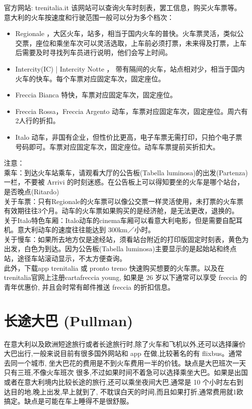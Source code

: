 \documentclass[3pt,a5paper,openright,twoside]{book}
\begin{document}
官方网站: trenitalia.it 该网站可以查询火车时刻表，罢工信息，购买火车票等。
意大利的火车按速度和行驶范围一般可以分为多个档次：
\begin{itemize}
\item  Regionale ，大区火车，站多，相当于国内火车的普快。火车票灵活，类似公交票，座位和乘坐车次可以灵活选取，上车前必须打票，未来得及打票，上车后需要及时寻找列车员进行说明，他们会写上时间。
\item  Intercity(IC) | Intercity Notte ， 带有隔间的火车，站点相对少，相当于国内火车的快车。每个车票对应固定车次，固定座位。
\item  Freccia Bianca 特快，车票对应固定车次，固定座位。
\item  Freccia Rossa，Freccia Argento 动车，车票对应固定车次，固定座位。周六有2人行的折扣。
\item  Italo 动车，非国有企业，但性价比更高，电子车票无需打印，只拍个电子票号码即可。车票对应固定车次，固定座位。动车车票提前买折扣大。
\end{itemize}
注意：\\
乘车：到达火车站乘车，请观看大厅的公告板(Tabella luminosa)的出发(Partenza)一栏，不要被 Arrivi 的时刻迷惑。在公告板上可以得知要坐的火车是哪个站台，是否晚点(Ritardo) \\
关于车票：只有Regionale的火车票可以像公交票一样灵活使用，未打票的火车票有效期往往3个月。动车的火车票如果购买的是经济舱，是无法更改，退换的。\\
关于Italo特色车厢：Italo动车的cinema车厢可以看意大利电影，但是需要自配耳机。意大利动车的速度往往能达到 300km／小时。\\
关于慢车：如果所去地方仅是途经站，须看站台附近的打印版固定时刻表，黄色为出发，白色为到达。因为公告板(Tabella luminosa)主要显示的是起始站和终点站，途径车站滚动显示，不太方便查询。\\
此外，下载app trenitalia 或 pronto treno 快速购买想要的火车票。以及在trenitalia官网上注册cartafreccia
young, 如果是 26 岁以下通常可以享受 freccia 的青年优惠价, 并且会时常有邮件推送 freccia 的折扣信息。

\section{长途大巴 (Pullman)}
在意大利以及欧洲短途旅行或者长途旅行时,除了火车和飞机以外,还可以选择廉价大巴出行,一般来说目前有很多国外网站和 app 在做,比较著名的有 flixbus。通常去同一个城市, 坐大巴花的费用是不到火车费用一半的价钱。缺点是大巴班次一天只有三班,不像火车班次 很多,不过如果时间不着急可以选择乘坐大巴。如果是出国或者在意大利境内比较长途的旅行,还可以乘坐夜间大巴,通常是 10 个小时左右到达目的地,晚上出发,早上就到了, 不耽误白天的时间,而且如果打折,通常费用就1欧搞定。缺点是可能在车上睡得不是很舒服。
\end{document}
